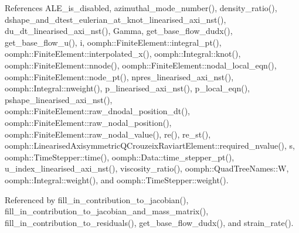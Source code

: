References A\+L\+E\+\_\+is\+\_\+disabled, azimuthal\+\_\+mode\+\_\+number(), density\+\_\+ratio(), dshape\+\_\+and\+\_\+dtest\+\_\+eulerian\+\_\+at\+\_\+knot\+\_\+linearised\+\_\+axi\+\_\+nst(), du\+\_\+dt\+\_\+linearised\+\_\+axi\+\_\+nst(), Gamma, get\+\_\+base\+\_\+flow\+\_\+dudx(), get\+\_\+base\+\_\+flow\+\_\+u(), i, oomph\+::\+Finite\+Element\+::integral\+\_\+pt(), oomph\+::\+Finite\+Element\+::interpolated\+\_\+x(), oomph\+::\+Integral\+::knot(), oomph\+::\+Finite\+Element\+::nnode(), oomph\+::\+Finite\+Element\+::nodal\+\_\+local\+\_\+eqn(), oomph\+::\+Finite\+Element\+::node\+\_\+pt(), npres\+\_\+linearised\+\_\+axi\+\_\+nst(), oomph\+::\+Integral\+::nweight(), p\+\_\+linearised\+\_\+axi\+\_\+nst(), p\+\_\+local\+\_\+eqn(), pshape\+\_\+linearised\+\_\+axi\+\_\+nst(), oomph\+::\+Finite\+Element\+::raw\+\_\+dnodal\+\_\+position\+\_\+dt(), oomph\+::\+Finite\+Element\+::raw\+\_\+nodal\+\_\+position(), oomph\+::\+Finite\+Element\+::raw\+\_\+nodal\+\_\+value(), re(), re\+\_\+st(), oomph\+::\+Linearised\+Axisymmetric\+Q\+Crouzeix\+Raviart\+Element\+::required\+\_\+nvalue(), s, oomph\+::\+Time\+Stepper\+::time(), oomph\+::\+Data\+::time\+\_\+stepper\+\_\+pt(), u\+\_\+index\+\_\+linearised\+\_\+axi\+\_\+nst(), viscosity\+\_\+ratio(), oomph\+::\+Quad\+Tree\+Names\+::W, oomph\+::\+Integral\+::weight(), and oomph\+::\+Time\+Stepper\+::weight().



Referenced by fill\+\_\+in\+\_\+contribution\+\_\+to\+\_\+jacobian(), fill\+\_\+in\+\_\+contribution\+\_\+to\+\_\+jacobian\+\_\+and\+\_\+mass\+\_\+matrix(), fill\+\_\+in\+\_\+contribution\+\_\+to\+\_\+residuals(), get\+\_\+base\+\_\+flow\+\_\+dudx(), and strain\+\_\+rate().

\mbox{\label{classoomph_1_1LinearisedAxisymmetricNavierStokesEquations_aa3924125dde70779c180b84408271422}} 
